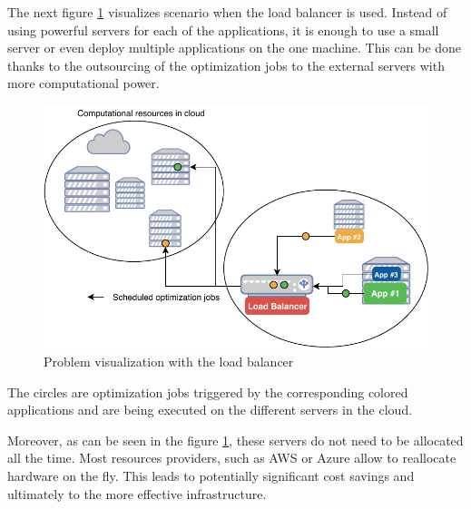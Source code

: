 The next figure \ref{fig:problem-with-load-balancer} visualizes scenario when the load balancer is used.
Instead of using powerful servers for each of the applications,
it is enough to use a small server or even deploy multiple applications on the one machine.
This can be done thanks to the outsourcing of the optimization jobs to the external servers with more computational power.
\begin{figure}[ht] 
    \includegraphics[width=\textwidth]{i_problem_scheme_jobs.pdf} 
    \centering
    \caption{Problem visualization with the load balancer}
    \label{fig:problem-with-load-balancer}
\end{figure}
The circles are optimization jobs triggered by the corresponding colored applications
and are being executed on the different servers in the cloud.

Moreover,
as can be seen in the figure \ref{fig:problem-with-load-balancer},
these servers do not need to be allocated all the time.
Most resources providers, 
such as AWS\cite{awsReference} or Azure\cite{azureReference} allow to reallocate hardware on the fly.
This leads to potentially significant cost savings 
and ultimately to the more effective infrastructure.

\newpage


